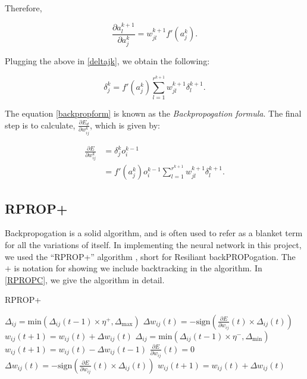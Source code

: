 Therefore,

\begin{equation}
    \frac{\partial a_l^{k+1}}{\partial a_j^k} = w_{jl}^{k+1}f'(a_j^k).
\end{equation}

Plugging the above in \ref{deltajk}, we obtain the following:

\begin{equation}
    \label{backpropform}
    \delta_j^k = f'(a_j^k)\sum^{r^{k+1}}_{l=1}w_{jl}^{k+1}\delta_l^{k+1}.
\end{equation}

The equation \ref{backpropform} is known as the \textit{Backpropogation formula}. The final step is to calculate, $\frac{\partial E_d}{\partial w_{ij}^k}$, which is given by:

\begin{align}
        \frac{\partial E}{\partial w_{ij}^k} &= \delta^k_jo_i^{k-1} \\
        &=f'(a_j^k)o^{k-1}_i \sum^{r^{k+1}}_{l=1}w_{jl}^{k+1}\delta_l^{k+1}.
\end{align}

\subsection{RPROP+}
Backpropogation is a solid algorithm, and is often used to refer as a blanket term for all the variations of itself. In implementing the neural network in this project, we used 
the ``RPROP+'' algorithm \cite{rprop}, short for Resiliant backPROPogation. The $+$ is notation for showing we include backtracking in the algorithm. In \ref{RPROPC}, 
we give the algorithm in detail. 

\begin{algorithm}[h]
    \caption{RPROP+}\label{RPROPC}
\begin{algorithmic}[1]
    \State $\Delta_{ij} = \text{min} (\Delta_{ij}(t-1)\times \eta^{+},\Delta_{\text{max}})$ 
    \State $\Delta w_{ij}(t) = -\text{sign}\left(\frac{\partial E}{\partial w_{ij}}(t) \times \Delta_{ij}(t)\right)$
    \State $w_{ij}(t+1) = w_{ij}(t) + \Delta w_{ij}(t)$
    \State $\Delta_{ij} = \text{min} (\Delta_{ij}(t-1)\times \eta^{-},\Delta_{\text{min}})$ 
    \State $w_{ij}(t+1) = w_{ij}(t) - \Delta w_{ij}(t-1)$
    \State $\frac{\partial E}{\partial w_{ij}}(t) = 0 $
    \State $\Delta w_{ij}(t) = -\text{sign}\left(\frac{\partial E}{\partial w_{ij}}(t) \times \Delta_{ij}(t)\right)$
    \State $w_{ij}(t+1) = w_{ij}(t) + \Delta w_{ij}(t)$
\EndIf
\EndFor
\end{algorithmic}   
\end{algorithm}


